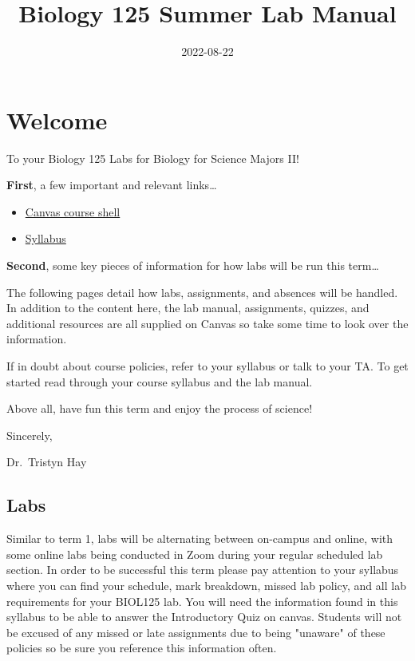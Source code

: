 \documentclass[
]{book}
\title{Biology 125 Summer Lab Manual}
\author{}
\date{\vspace{-2.5em}2022-08-22}
\providecommand{\tightlist}{%
  \setlength{\itemsep}{0pt}\setlength{\parskip}{0pt}}
\begin{document}
\maketitle

{
\setcounter{tocdepth}{1}
\tableofcontents
}
\hypertarget{welcome}{%
\chapter*{Welcome}\label{welcome}}

To your Biology 125 Labs for Biology for Science Majors II!

\textbf{First}, a few important and relevant links\ldots{}

\begin{itemize}
\tightlist
\item
  \href{https://canvas.ubc.ca/courses/94573}{Canvas course shell}
\item
  \href{https://canvas.ubc.ca/courses/94573/files/20871008}{Syllabus}
\end{itemize}

\textbf{Second}, some key pieces of information for how labs will be run this term\ldots{}

The following pages detail how labs, assignments, and absences will be handled. In addition to the content here, the lab manual, assignments, quizzes, and additional resources are all supplied on Canvas so take some time to look over the information.

If in doubt about course policies, refer to your syllabus or talk to your TA. To get started read through your course syllabus and the lab manual.

Above all, have fun this term and enjoy the process of science!

Sincerely,

Dr.~Tristyn Hay

\hypertarget{labs}{%
\section*{Labs}\label{labs}}

Similar to term 1, labs will be alternating between on-campus and online, with some online labs being conducted in Zoom during your regular scheduled lab section. In order to be successful this term please pay attention to your syllabus where you can find your schedule, mark breakdown, missed lab policy, and all lab requirements for your BIOL125 lab. You will need the information found in this syllabus to be able to answer the Introductory Quiz on canvas. Students will not be excused of any missed or late assignments due to being "unaware" of these policies so be sure you reference this information often.
\end{document}
